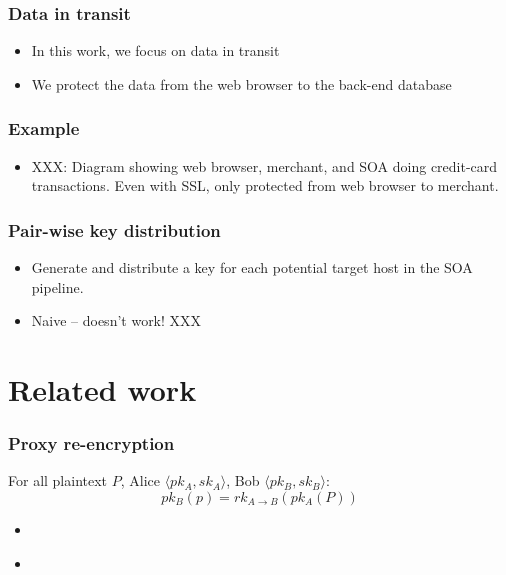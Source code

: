 \documentclass{beamer}
\begin{document}
\begin{frame}
\frametitle{Data in transit}
\begin{itemize}
\item In this work, we focus on data in transit
\item We protect the data from the web browser to the back-end database
\end{itemize}
\end{frame}

\begin{frame}
\frametitle{Example}
\begin{itemize}
\item XXX: Diagram showing web browser, merchant, and SOA doing credit-card
transactions.  Even with SSL, only protected from web browser to merchant.
\end{itemize}
\end{frame}

\begin{frame}
\frametitle{Pair-wise key distribution}
\begin{itemize}
\item Generate and distribute a key for each potential target host in the SOA
pipeline.  
\item Naive -- doesn't work!  XXX
\end{itemize}
\end{frame}

\section{Related work}


\begin{frame}
\frametitle{Proxy re-encryption}
For all plaintext $P$, Alice $\langle pk_A, sk_A \rangle$, Bob $\langle pk_B,
sk_B \rangle$:
\begin{equation*}
pk_B(p) = rk_{A \to B}( pk_A (P))
\end{equation*}
\begin{itemize}
\item \cite{atomic_proxy_reencryption} 
\item \cite{proxy_reencryption}
\end{itemize}
\end{frame}
\end{document}
